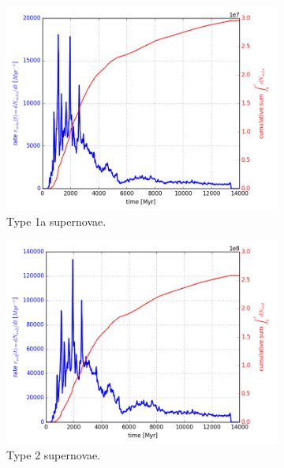 \begin{figure}
  \centering
  \begin{subfigure}{\subfigwidth}
    \includegraphics[width=\linewidth]{results/MCExperiment_revised_2_delmax/sn1a.png}
    \caption{ \label{fig:MCExperiment-delmax-sn1a} \footnotesize
      Type 1a supernovae.
    }
  \end{subfigure}
  \begin{subfigure}{\subfigwidth}
    \includegraphics[width=\linewidth]{results/MCExperiment_revised_2_delmax/sn2.png}
    \caption{ \label{fig:MCExperiment-delmax-sn2} \footnotesize
      Type 2 supernovae.
    }
  \end{subfigure}
  \begin{subfigure}{\figwidth}

\end{subfigure}
\end{figure}
